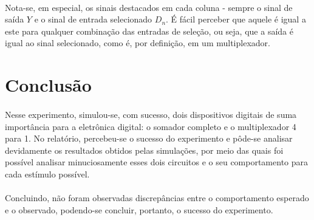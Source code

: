 \documentclass[a4paper,12pt]{article}
\begin{document}
\paragraph{}
Nota-se, em especial, os sinais destacados em cada coluna - sempre o sinal de saída $Y$ e o sinal de entrada selecionado $D_{n}$. É fácil perceber que aquele é igual a este para qualquer combinação das entradas de seleção, ou seja, que a saída é igual ao sinal selecionado, como é, por definição, em um multiplexador.

\section{Conclusão}

\paragraph{}
Nesse experimento, simulou-se, com sucesso, dois dispositivos digitais de suma importância para a eletrônica digital: o somador completo e o multiplexador 4 para 1. No relatório, percebeu-se o sucesso do experimento e pôde-se analisar devidamente os resultados obtidos pelas simulações, por meio das quais foi possível analisar minuciosamente esses dois circuitos e o seu comportamento para cada estímulo possível.

\paragraph{}
Concluindo, não foram observadas discrepâncias entre o comportamento esperado e o observado, podendo-se concluir, portanto, o sucesso do experimento.
\end{document}
